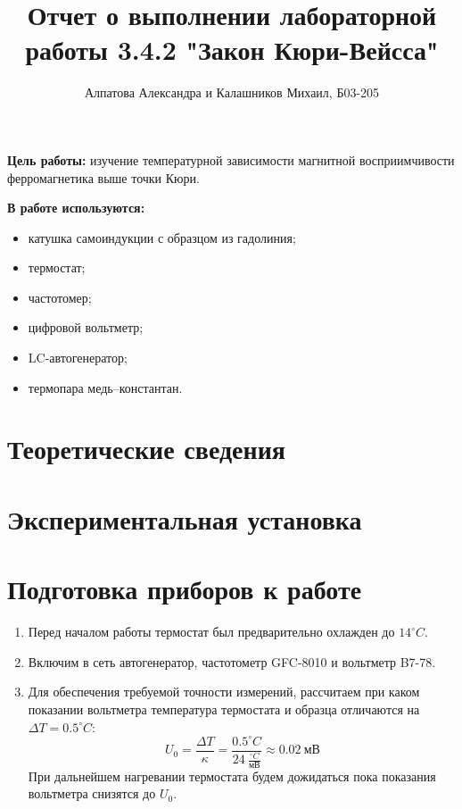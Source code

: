 \documentclass[14pt, a4paper]{report}
\title{\textbf{Отчет о выполнении лабораторной работы 3.4.2 "Закон Кюри-Вейсса"}}
\author{Алпатова Александра и Калашников Михаил, Б03-205}
\date{}
\begin{document}
	\maketitle
	
	\textbf{Цель работы:}
	изучение температурной зависимости магнитной восприимчивости ферромагнетика выше точки Кюри.
	\newline
	
	\textbf{В работе используются:}
	\begin{itemize}
		\item катушка самоиндукции с образцом из гадолиния;
		\item термостат;
		\item частотомер;
		\item цифровой вольтметр;
		\item LC-автогенератор;
		\item термопара медь–константан.
	\end{itemize}
	
	\section{Теоретические сведения}
	
	
	
	\section{Экспериментальная установка}
	
	
	
	\section{Подготовка приборов к работе}
	
		\begin{enumerate}
		
			\setcounter{enumi}{0}
			
			\item Перед началом работы термостат был предварительно охлажден до $14^\circ C$.
	
			\item Включим в сеть автогенератор, частотометр GFC-8010 и вольтметр B7-78.
	
			\item Для обеспечения требуемой точности измерений, рассчитаем при каком показании вольтметра температура термостата и образца отличаются на $\Delta T=0.5^\circ C$:
			\[U_0=\frac{\Delta T}{\kappa}=\frac{0.5^\circ C}{24\ \frac{^\circ C}{мВ}}\approx0.02\ мВ\]
			При дальнейшем нагревании термостата будем дожидаться пока показания вольтметра 
снизятся до $U_0$.

		\end{enumerate}
\end{document}
